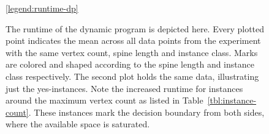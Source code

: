 \begin{figure}
    \centering


    \scalebox{1}{}
    \scalebox{1}{}
    \ref{legend:runtime-dp}
    
    \caption[Dynamic program runtime]{The runtime of the dynamic program is depicted here. Every plotted point indicates the mean across all data points from the experiment with the same vertex count, spine length and instance class. Marks are colored and shaped according to the spine length and instance class respectively. The second plot holds the same data, illustrating just the yes-instances. Note the increased runtime for instances around the maximum vertex count as listed in Table~\ref{tbl:instance-count}. These instances mark the decision boundary from both sides, where the available space is saturated.}
    \label{fig:ch5_runtime_dp}
\end{figure}

